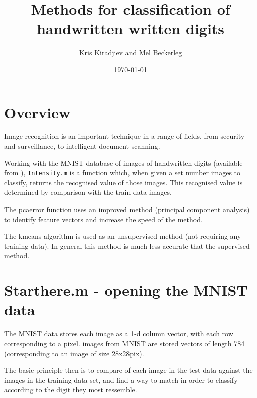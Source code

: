 \documentclass[12pt]{article}
\begin{document}
\title{Methods for classification of handwritten written digits}
\date{\today}
\author{Kris Kiradjiev and Mel Beckerleg}
\maketitle

\section{Overview}

Image recognition is an important technique in a range of fields, from security and surveillance, to intelligent document scanning. 

Working with the MNIST database of images of handwritten digits (available from \cite{MNIST}), \texttt{Intensity.m} is a function which, when given a set number images to classify, returns the recognised value of those images. This recognised value is determined by comparison with the train data images. 

The pcaerror function uses an improved method (principal component analysis) to identify feature vectors and increase the speed of the method.

The kmeans algorithm is used as an unsupervised method (not requiring any training data). In general this method is much less accurate that the supervised method.

\section{Starthere.m - opening the MNIST data}


The MNIST data stores each image as a 1-d column vector, with each row corresponding to a pixel. images from MNIST are stored vectors of length 784 (corresponding to an image of size 28x28pix). 

The basic principle then is to compare of each image in the test data against the images in the training data set, and find a way to match in order to classify according to the digit they most ressemble.   
\end{document}
